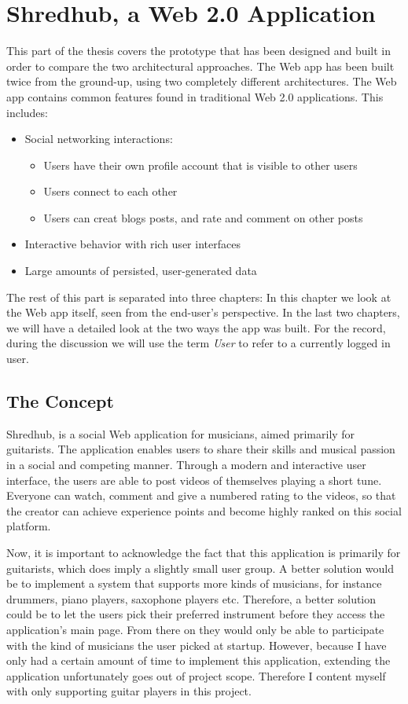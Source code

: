 \chapter{Shredhub, a Web 2.0 Application}
This part of the thesis covers the prototype that has been designed and built in order to compare the two architectural approaches. The Web app has been built twice from the ground-up, using two completely different architectures. The Web app contains common features found in traditional Web 2.0 applications. This includes:
\begin{itemize}
\item{} Social networking interactions:
	\begin{itemize}
		\item{} Users have their own profile account that is visible to other users
		\item{} Users connect to each other
		\item{} Users can creat blogs posts, and rate and comment on other posts
		\end{itemize}
\item{} Interactive behavior with rich user interfaces
\item{} Large amounts of persisted, user-generated data
\end{itemize}

The rest of this part is separated into three chapters: In this chapter we look at the Web app itself, seen from the end-user's perspective. In the last two chapters, we will have a detailed look at the two ways the app was built. For the record, during the discussion we will use the term \textit{User} to refer to a currently logged in user.
	
\section {The Concept}
Shredhub, is a social Web application for musicians, aimed primarily for guitarists. The application enables users to share their skills and musical passion in a social and competing manner. Through a modern and interactive user interface, the users are able to post videos of themselves playing a short tune. Everyone can watch, comment and give a numbered rating to the videos, so that the creator can achieve experience points and become highly ranked on this social platform. 
		
Now, it is important to acknowledge the fact that this application is primarily for guitarists, which does imply a slightly small user group. A better solution would be to implement a system that supports more kinds of musicians, for instance drummers, piano players, saxophone players etc. Therefore, a better solution could be to let the users pick their preferred instrument before they access the application's main page. From there on they would only be able to participate with the kind of musicians the user picked at startup. However, because I have only had a certain amount of time to implement this application, extending the application unfortunately goes out of project scope. Therefore I content myself with only supporting guitar players in this project. 
		
